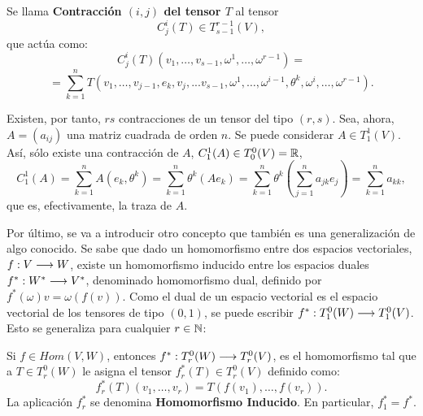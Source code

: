 \documentclass[cursovd_portada.tex]{subfiles}
\begin{document}
\begin{defiap}
Se llama {\bf Contracción $(i,j)$ del tensor $T$} al tensor
$$C^i_j(T)\in T^{r-1}_{s-1}(V),$$
que actúa como:
$$C^i_j(T)(v_1,\dots ,v_{s-1},\omega^1,\dots ,\omega^{r-1})=$$
$$=\sum_{k=1}^nT(v_1,\dots ,v_{j-1},e_k,v_j,...v_{s-1},\omega^1,\dots ,\omega^
{i-1},\theta^k,\omega^i,\dots ,\omega^{r-1}).$$
\end{defiap}
\par\bigskip
Existen, por tanto, $rs$ contracciones de un tensor del tipo $(r,s)$. Sea, ahora, $A=(a_{ij})$ una matriz cuadrada
de orden $n$. Se puede considerar $A \in T^1_1(V)$. Así, sólo existe una contracción de $A$, $C^1_1(A)\in T^0_0(V)
=\mathbb{R}$,
$$C^1_1(A)=\sum_{k=1}^nA(e_k,\theta^k)=\sum_{k=1}^n\theta ^k(Ae_k)=
\sum_{k=1}^n\theta^k(\sum_{j=1}^na_{jk}e_j)=\sum_{k=1}^na_{kk},$$ que es, efectivamente, la traza de $A$.
\par
Por último, se va a introducir otro concepto que también es una ge\-ne\-ra\-li\-za\-ción de algo conocido. Se sabe
que dado un homomorfismo entre dos espacios vectoriales, $f:V\longrightarrow W$, existe un homomorfismo inducido entre los
espacios duales $f^*:W^*\longrightarrow V^*$, denominado homomorfismo dual, definido por $f^*( \omega)v=\omega(f(v))$. Como el
dual de un espacio vectorial es el espacio vectorial de los tensores de tipo $(0,1)$, se puede escribir
$f^*:T^0_1(W)\longrightarrow T^0_1(V)$. Esto se generaliza para cualquier $r\in\mathbb{N}$:
\begin{defiap}
Si $f\in Hom(V,W)$, entonces $f^*:T^0_r(W)\longrightarrow T^0_r(V)$, es el homomorfismo tal que a $T\in T^0_r(W)$ le asigna el
tensor $f^*_r(T)\in T^0_r(V)$ definido como:
$$f^*_r(T)(v_1,\dots ,v_r)=T(f(v_1),\dots ,f(v_r)).$$
\hs La aplicación $f^*_r$ se denomina {\bf Homomorfismo Inducido}. En particular, $f^*_1=f^*$.
\end{defiap}
\end{document}
